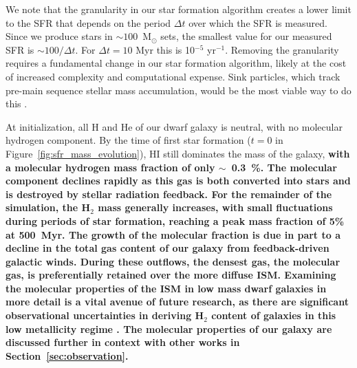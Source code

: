 \documentclass[fleqn,usenatbib,useAMS]{mnras}
\begin{document}
We note that the granularity in our star formation algorithm creates a lower limit to the SFR that depends on the period $\Delta t$ over which the SFR is measured. Since we produce stars in $\sim 100$~M$_{\odot}$ sets, the smallest value for our measured SFR is $\sim 100/ \Delta t$. For $\Delta t = 10$ Myr this is 10$^{-5}$ yr$^{-1}$. Removing the granularity requires a fundamental change in our star formation algorithm, likely at the cost of increased complexity and computational expense. Sink particles, which track pre-main sequence stellar mass accumulation, would be the most viable way to do this \citep[see for example ][]{Krumholz2004,Federrath2010,GongOstriker2013,BleulerTeyssier2014,Sormani2017}.

At initialization, all H and He of our dwarf galaxy is neutral, with no molecular hydrogen component. By the time of first star formation ($t=0$ in Figure~\ref{fig:sfr_mass_evolution}), HI still dominates the mass of the galaxy, \textbf{ with a molecular hydrogen mass fraction of only $\sim$~0.3~\%. The molecular component declines rapidly as this gas is both converted into stars and is destroyed by stellar radiation feedback. For the remainder of the simulation, the H$_2$ mass generally increases,  with small fluctuations during periods of star formation, reaching a peak mass fraction of 5\% at 500~Myr. The growth of the molecular fraction is due in part to a decline in the total gas content of our galaxy from feedback-driven galactic winds. During these outflows, the densest gas, the molecular gas, is preferentially retained over the more diffuse ISM. Examining the molecular properties of the ISM in low mass dwarf galaxies in more detail is a vital avenue of future research, as there are significant observational uncertainties in deriving H$_2$ content of galaxies in this low metallicity regime \citep{Leroy2008,McQuinn2012,Amorin2016}. The molecular properties of our galaxy are discussed further in context with other works in Section~\ref{sec:observation}.}
\end{document}
